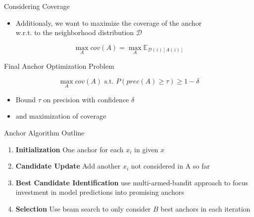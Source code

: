 \documentclass[aspectratio=169]{../latex_main/tntbeamer}  %
\begin{document}

\begin{frame}[c]{Considering Coverage}

\begin{itemize}
    \item Additionaly, we want to maximize the coverage of the anchor\\ w.r.t. to the neighborhood distribution $\mathcal{D}$
\end{itemize}

$$\max_{A} cov(A) = \max_{A} \mathbb{E}_{\mathcal{D}(z)[A(z)]} $$


\end{frame}


\begin{frame}[c]{Final Anchor Optimization Problem}

\begin{equation}
\max_{A} cov(A) \text{ s.t. } P(prec(A) \geq \tau) \geq 1 - \delta
\end{equation}

\begin{itemize}
    \item Bound $\tau$ on precision with confidence $\delta$
    \item and maximization of coverage
\end{itemize}


\end{frame}


\begin{frame}[c]{Anchor Algorithm Outline }

\begin{enumerate}

    \item \textbf{Initialization} One anchor for each $x_i$ in given $x$
    \item \textbf{Candidate Update} Add another $x_i$ not considered in A so far
    \item \textbf{Best Candidate Identification} use multi-armed-bandit approach to focus investment in model predictions into promising anchors 
    \item \textbf{Selection} Use beam search to only consider $B$ best anchors in each iteration 
\end{enumerate}

\end{frame}
\end{document}
